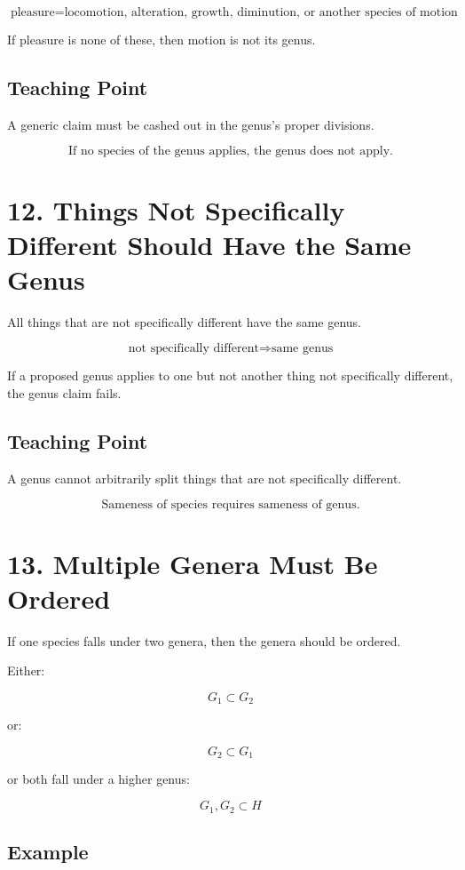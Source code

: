 \documentclass[12pt]{article}
\begin{document}
\[
\text{pleasure} =
\text{locomotion, alteration, growth, diminution, or another species of motion}
\]

If pleasure is none of these, then motion is not its genus.

\subsection*{Teaching Point}

A generic claim must be cashed out in the genus's proper divisions.

\[
\boxed{
\text{If no species of the genus applies, the genus does not apply.}
}
\]

\section*{12. Things Not Specifically Different Should Have the Same Genus}

All things that are not specifically different have the same genus.

\[
\text{not specifically different} \Rightarrow \text{same genus}
\]

If a proposed genus applies to one but not another thing not specifically
different, the genus claim fails.

\subsection*{Teaching Point}

A genus cannot arbitrarily split things that are not specifically different.

\[
\boxed{
\text{Sameness of species requires sameness of genus.}
}
\]

\section*{13. Multiple Genera Must Be Ordered}

If one species falls under two genera, then the genera should be ordered.

Either:

\[
G_1 \subset G_2
\]

or:

\[
G_2 \subset G_1
\]

or both fall under a higher genus:

\[
G_1, G_2 \subset H
\]

\subsection*{Example}
\end{document}
